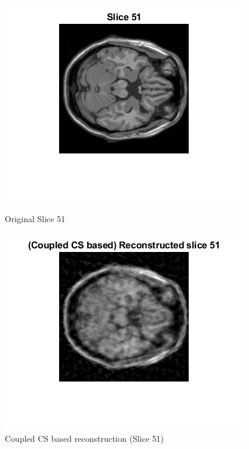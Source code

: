 \documentclass[12pt]{article}
\begin{document}
\begin{enumerate}[label = (\alph*)]
\begin{figure}[H]
    \end{figure}
    \begin{figure}[H]
        \centering
        \begin{minipage}{.45\textwidth}
            \centering
            \includegraphics[width=\linewidth]{Images/Q3_51.png}
            \caption*{Original Slice 51}
        \end{minipage}
        \begin{minipage}{.45\textwidth}
            \centering
            \includegraphics[width=\linewidth]{Images/Q3_51_c.png}
            \caption*{Coupled CS based reconstruction (Slice 51)}
        \end{minipage}
    \end{figure}


\end{enumerate}
\end{document}
